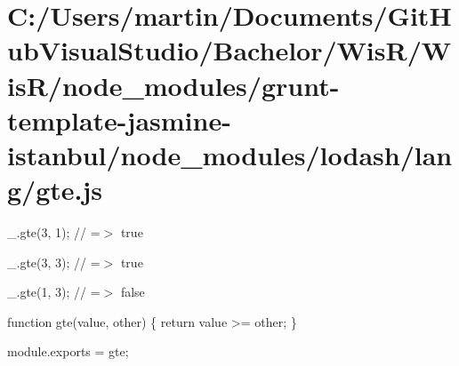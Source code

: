 \hypertarget{_c_1_2_users_2martin_2_documents_2_git_hub_visual_studio_2_bachelor_2_wis_r_2_wis_r_2node_module32bc4c264b48af0541fdf1442b622704}{}\section{C\+:/\+Users/martin/\+Documents/\+Git\+Hub\+Visual\+Studio/\+Bachelor/\+Wis\+R/\+Wis\+R/node\+\_\+modules/grunt-\/template-\/jasmine-\/istanbul/node\+\_\+modules/lodash/lang/gte.\+js}
\+\_\+.\+gte(3, 1); // =$>$ true

\+\_\+.\+gte(3, 3); // =$>$ true

\+\_\+.\+gte(1, 3); // =$>$ false


\begin{DoxyCodeInclude}

\textcolor{keyword}{function} gte(value, other) \{
  \textcolor{keywordflow}{return} value >= other;
\}

module.exports = gte;
\end{DoxyCodeInclude}
 